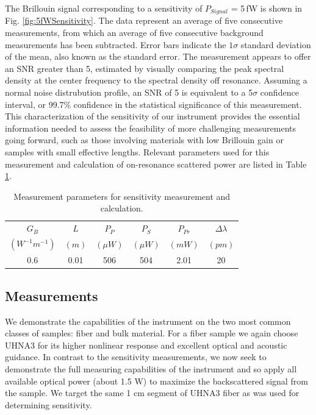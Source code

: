 \documentclass[%
  reprint,
  superscriptaddress,
  amsmath,amssymb,
  aps,
  prapplied,
]{revtex4-2}
\begin{document}
The Brillouin signal corresponding to a sensitivity of $P_{Signal}$ = 5\,fW is shown in Fig. \ref{fig:5fWSensitivity}. The data represent an average of five consecutive measurements, from which an average of five consecutive background measurements has been subtracted. Error bars indicate the $1\sigma$ standard deviation of the mean, also known as the standard error. The measurement appears to offer an SNR greater than 5, estimated by visually comparing the peak spectral density at the center frequency to the spectral density off resonance. Assuming a normal noise distrubution profile, an SNR of 5 is equivalent to a 5$\sigma$ confidence interval, or 99.7\% confidence in the statistical significance of this measurement. This characterization of the sensitivity of our instrument provides the essential information needed to assess the feasibility of more challenging measurements going forward, such as those involving materials with low Brillouin gain or samples with small effective lengths. Relevant parameters used for this measurement and calculation of on-resonance scattered power are listed in Table \ref{tab:sensitivity}.

\begin{table}[h]
    \centering
    \begin{tabular}{|c|c|c|c|c|c|}
        \hline
        $G_{B}$ & $L$ & $P_{P}$ & $P_{S}$ & $P_{Pr}$ & $\Delta\lambda$ \\
        $(W^{-1}m^{-1})$ & $(m)$ & $(\mu W)$ & $(\mu W)$ & $(mW)$ & $(pm)$ \\
        \hline
        0.6 & 0.01 & 506 & 504 & 2.01 & 20 \\
        \hline
    \end{tabular}
    \caption{Measurement parameters for sensitivity measurement and calculation.}
    \label{tab:sensitivity}
\end{table}

\subsection*{Measurements}
\label{Results:Measurements}

We demonstrate the capabilities of the instrument on the two most common classes of samples: fiber and bulk material. For a fiber sample we again choose UHNA3 for its higher nonlinear response and excellent optical and acoustic guidance. In contrast to the sensitivity measurements, we now seek to demonstrate the full measuring capabilities of the instrument and so apply all available optical power (about 1.5 W) to maximize the backscattered signal from the sample. We target the same 1 cm segment of UHNA3 fiber as was used for determining sensitivity.
\end{document}
